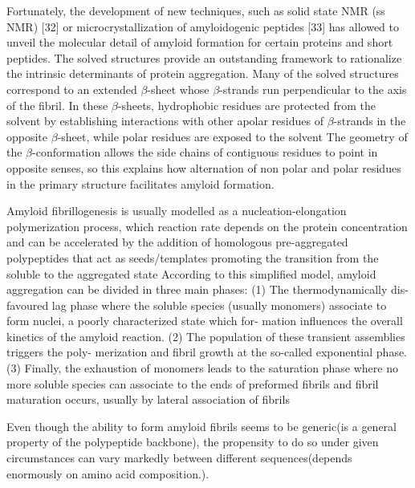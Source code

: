 Fortunately, the development of new techniques, such as solid state NMR (ss NMR) [32] or microcrystallization
of amyloidogenic peptides [33] has allowed to unveil the molecular detail of
amyloid formation for certain proteins and short peptides. The solved structures
provide an outstanding framework to rationalize the intrinsic determinants of protein
aggregation. Many of the solved structures correspond to an extended $\beta$-sheet whose
$\beta$-strands run perpendicular to the axis of the fibril. In these $\beta$-sheets, hydrophobic
residues are protected from the solvent by establishing interactions with other apolar
residues of $\beta$-strands in the opposite $\beta$-sheet, while polar residues are exposed to the
solvent The geometry of the $\beta$-conformation allows the side chains of contiguous
residues to point in opposite senses, so this explains how alternation of non polar
and polar residues in the primary structure facilitates amyloid formation.







Amyloid fibrillogenesis is usually modelled as a nucleation-elongation polymerization process, which reaction rate depends on the protein concentration and can be accelerated 
by the addition of homologous pre-aggregated polypeptides that act as seeds/templates promoting the transition from the soluble to the aggregated state
According to this simplified model, amyloid aggregation can be divided in three main phases: 
(1) The thermodynamically dis-
favoured lag phase where the soluble species (usually monomers)
associate to form nuclei, a poorly characterized state which for-
mation influences the overall kinetics of the amyloid reaction. (2)
The population of these transient assemblies triggers the poly-
merization and fibril growth at the so-called exponential phase.
(3) Finally, the exhaustion of monomers leads to the saturation
phase where no more soluble species can associate to the ends of
preformed fibrils and fibril maturation occurs, usually by lateral
association of fibrils








Even though the ability to form amyloid fibrils seems to be generic(is a general property of the polypeptide backbone), 
the propensity to do so under given circumstances can vary markedly between different sequences(depends enormously on amino acid composition.).

